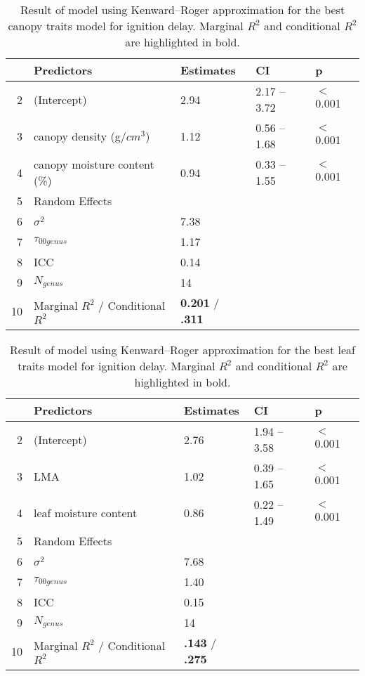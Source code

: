\documentclass[12pt]{report}
\begin{document}
\begin{table}
\centering
\caption{Result of model using Kenward--Roger approximation for the best canopy traits model for ignition delay. Marginal $R^2$ and conditional $R^2$ are highlighted in bold.}
\begin{tabular}{rllll}
  \hline
 & Predictors & Estimates & CI & p \\ 
  \hline
2 & (Intercept) & 2.94 & 2.17 – 3.72 & $<$0.001 \\ 
3 & canopy density (g/{$cm^3$}) & 1.12 & 0.56 – 1.68 & $<$0.001 \\ 
  4 & canopy moisture content (\%) & 0.94 & 0.33 – 1.55 & $<$0.001 \\ 
  5 & Random Effects &  &  &  \\ 
  6 & $\sigma^2$ & 7.38 &  &  \\ 
  7 & $\tau_{00 genus}$ & 1.17 &  &  \\ 
  8 & ICC & 0.14 &  &  \\ 
  9 & $N_{genus}$ & 14 &  &  \\ 
  10 & Marginal $R^2$ / Conditional $R^2$ & \textbf{0.201} / \textbf{.311} &  &  \\  
   \hline
\end{tabular}
\end{table}


\begin{table}[ht]
\centering
\caption{Result of model using Kenward--Roger approximation for the best leaf traits model for ignition delay. Marginal $R^2$ and conditional $R^2$ are highlighted in bold.}
\begin{tabular}{rllll}
  \hline
 & Predictors & Estimates & CI & p \\ 
  \hline
2 & (Intercept) & 2.76 & 1.94 – 3.58 & $<$0.001 \\ 
  3 & LMA & 1.02 & 0.39 – 1.65 & $<$0.001 \\ 
  4 & leaf moisture content & 0.86 & 0.22 – 1.49 & $<$0.001 \\ 
  5 & Random Effects &  &  &  \\ 
  6 & $\sigma^2$ & 7.68 &  &  \\ 
  7 & $\tau_{00 genus}$ & 1.40 &  &  \\ 
  8 & ICC & 0.15 &  &  \\ 
  9 & $N_{genus}$ & 14 &  &  \\ 
  10 & Marginal $R^2$ / Conditional $R^2$ & \textbf{.143} / \textbf{.275} &  &  \\ 
   \hline
\end{tabular}
\end{table}
\end{document}
